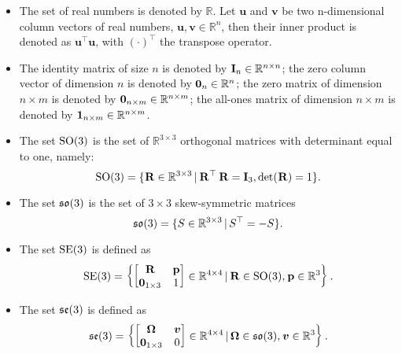 \begin{itemize}

\item
The set of real numbers is denoted by $\mathbb{R}$.
Let $\mathbf{u}$ and $\mathbf{v}$ be two n-dimensional column vectors of real numbers, \ie $\mathbf{u}, \mathbf{v} \in \mathbb{R}^n$, then their inner product is denoted as $\mathbf{u}^\top \mathbf{u}$, with ${(\cdot)}^\top$ the transpose operator.

\item
The identity matrix of size $n$ is denoted by $\mathbf{I}_n \in \mathbb{R}^{n \times n}$; the zero column vector of dimension $n$ is denoted by $\boldsymbol{0}_n \in \mathbb{R}^n$; the zero matrix of dimension $n \times m$ is denoted by $\boldsymbol{0}_{n \times m} \in \mathbb{R}^{n \times m}$; the all-ones matrix of dimension $n \times m$ is denoted by $\boldsymbol{1}_{n \times m} \in \mathbb{R}^{n \times m}$.

\item
The set $\text{SO}(3)$ is the set of $\mathbb{R}^{3\times3}$ orthogonal matrices with determinant equal to one, namely:
%
\begin{equation*}
    \text{SO}(3) = \{ \prescript{}{}{\mathbf{R}} \in \mathbb{R}^{3 \times 3} \operatorname{\mid} \prescript{}{}{\mathbf{R}}^\top \prescript{}{}{\mathbf{R}} = \mathbf{I}_3, \operatorname{det}(\prescript{}{}{\mathbf{R}}) = 1 \}
    .
\end{equation*}

\item
The set $\mathfrak{so}(3)$ is the set of $3\times3$ skew-symmetric matrices
%
\begin{equation*}
    \mathfrak{so}(3) = \{ S \in \mathbb{R}^{3\times3} \operatorname{\mid} S^\top = -S \}
    .
\end{equation*}

\item
The set $\text{SE}(3)$ is defined as
%
\begin{equation*}
    \text{SE}(3) = \left\{ \begin{bmatrix} \prescript{}{}{\mathbf{R}} & \prescript{}{}{\mathbf{p}} \\ \boldsymbol{0}_{1 \times 3} & 1 \end{bmatrix}  \in \mathbb{R}^{4 \times 4} \operatorname{\mid} \prescript{}{}{\mathbf{R}} \in \text{SO}(3), \prescript{}{}{\mathbf{p}} \in \mathbb{R}^3 \right\}
    .
\end{equation*}

\item
The set $\mathfrak{se}(3)$ is defined as
\begin{equation*}
    \mathfrak{se}(3) = \left\{ \begin{bmatrix} \boldsymbol{\Omega} & \prescript{}{}{\boldsymbol{v}} \\ \boldsymbol{0}_{1\times3} & 0 \end{bmatrix} \in \mathbb{R}^{4\times4} \operatorname{\mid} \boldsymbol{\Omega} \in \mathfrak{so}(3), \prescript{}{}{\boldsymbol{v}} \in \mathbb{R}^3 \right\}
    .
\end{equation*}


\end{itemize}
